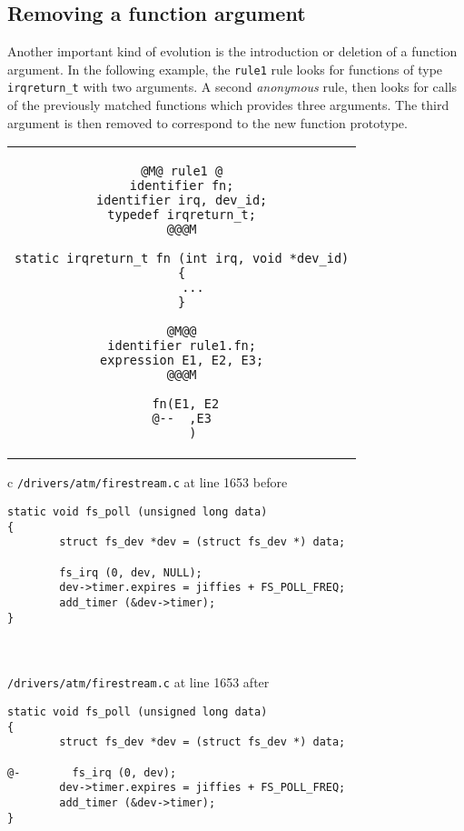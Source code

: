 \newpage
\subsection{Removing a function argument}

Another important kind of evolution is the introduction or deletion of
a function argument. In the following example, the \texttt{rule1} rule
looks for functions of type \texttt{irqreturn\_t} with two
arguments. A second \emph{anonymous} rule, then looks for calls of the
previously matched functions which provides three arguments. The third
argument is then removed to correspond to the new function prototype.\\

\begin{tabular}{c}
\begin{lstlisting}[language=Cocci,name=arg]
@M@ rule1 @
identifier fn;
identifier irq, dev_id;
typedef irqreturn_t;
@@@M

static irqreturn_t fn (int irq, void *dev_id)
{
   ...
}

@M@@
identifier rule1.fn;
expression E1, E2, E3;
@@@M

 fn(E1, E2
@--  ,E3
   )
\end{lstlisting}\\
\end{tabular}

\vspace{1cm}

\begin{tabular}{c}
  \texttt{/drivers/atm/firestream.c} at line 1653 before\\
\begin{lstlisting}[language=PatchC]
static void fs_poll (unsigned long data)
{
        struct fs_dev *dev = (struct fs_dev *) data;

        fs_irq (0, dev, NULL);
        dev->timer.expires = jiffies + FS_POLL_FREQ;
        add_timer (&dev->timer);
}
\end{lstlisting}\\
\vspace{1cm}
\\


  \texttt{/drivers/atm/firestream.c} at line 1653 after\\
\begin{lstlisting}[language=PatchC]
static void fs_poll (unsigned long data)
{
        struct fs_dev *dev = (struct fs_dev *) data;

@-        fs_irq (0, dev);
        dev->timer.expires = jiffies + FS_POLL_FREQ;
        add_timer (&dev->timer);
}
\end{lstlisting}\\
\end{tabular}


